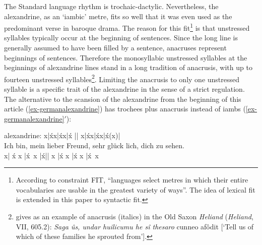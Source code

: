 \documentclass[output=paper
  ,nobabel
  ,uniformtopskip %
]{langscibook}
\begin{document}
The Standard  language rhythm is trochaic-dactylic. Nevertheless, the alexandrine, as an
`iambic' metre, fits  so well that it was even used as the predominant verse in  baroque
drama. The reason for this fit\footnote{According to \citep[294]{HansonKiparsky1996} constraint FIT,
  ``languages select metres in which their entire vocabularies are usable in the greatest variety of
  ways''. The idea of lexical fit is extended in this paper to syntactic fit.} is that unstressed
syllables typically occur at the beginning of  sentences. Since the  long line is
generally assumed to have been filled by a sentence, anacruses represent beginnings of
sentences. Therefore the monosyllabic unstressed syllables at the beginnings of alexandrine lines
stand in a long tradition of  anacrusis, with up to fourteen unstressed
syllables\footnote{\citet*[§216]{Heusler1925} gives as an example of anacrusis (italics) in the
  Old Saxon \textit{Heliand} (\textit{Heliand}, VII, 605.2): \emph{Saga ûs, undar huilicumu he
    sî thesaro} cunneo afôdit [`Tell us of which of these families he sprouted from'].}. 
Limiting the anacrusis to only one unstressed syllable is a specific trait of the alexandrine in the sense of
a strict regulation. The alternative to the scansion of the  alexandrine from the beginning of this article (\ref{ex-germanalexandrine}) has trochees plus anacrusis instead of iambs (\ref{ex-germanalexandrine}$'$):

{
\begin{exe}
 alexandrine: x|x́x|x́x|x́ || x|x́x|x́x|x́(x)|\\
\gll Ich  bin,  mein  lieber  Freund,           sehr  glück  lich,  dich  zu  sehen.\\
     x|	  x́	x     |x́~x    |x́\hspace{23pt}|| x     |x́     x	    |x́	  x	|x́~x\\
\end{exe}}
\end{document}
